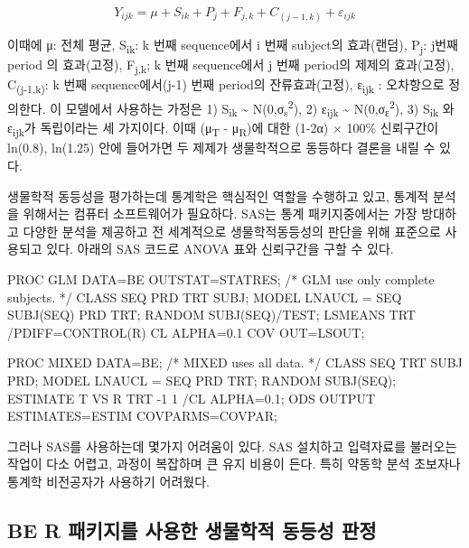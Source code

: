 \documentclass[
  11pt,
  krantz2, a4paper, twoside]{krantz}
\newenvironment{Shaded}{\begin{snugshade}}{\end{snugshade}}
\newcommand{\NormalTok}[1]{#1}
\theoremstyle{definition}
\theoremstyle{definition}
\theoremstyle{definition}
\theoremstyle{definition}
\theoremstyle{remark}
\begin{document}
\[
Y_{ijk} = \mu + S_{ik} + P_{j} + F_{j,k} + C_{(j-1,k)} + \varepsilon_{ijk}
\]

이때에 μ: 전체 평균, S\textsubscript{ik}: k 번째 sequence에서 i 번째 subject의 효과(랜덤), P\textsubscript{j}: j번째 period 의 효과(고정), F\textsubscript{j,k}; k 번째 sequence에서 j 번째 period의 제제의 효과(고정), C\textsubscript{(j-1,k)}: k 번째 sequence에서(j-1) 번째 period의 잔류효과(고정), ε\textsubscript{ijk} : 오차항으로 정의한다.
이 모델에서 사용하는 가정은 1) S\textsubscript{ik} \textasciitilde{} N(0,σ\textsubscript{s}\textsuperscript{2}), 2) ε\textsubscript{ijk} \textasciitilde{} N(0,σ\textsubscript{ε}\textsuperscript{2}), 3) S\textsubscript{ik} 와 ε\textsubscript{ijk}가 독립이라는 세 가지이다. 이때 (μ\textsubscript{T} - μ\textsubscript{R})에 대한 (1-2α) × 100\% 신뢰구간이 ln(0.8), ln(1.25) 안에 들어가면 두 제제가 생물학적으로 동등하다 결론을 내릴 수 있다.

생물학적 동등성을 평가하는데 통계학은 핵심적인 역할을 수행하고 있고, 통계적 분석을 위해서는 컴퓨터 소프트웨어가 필요하다. SAS는 통계 패키지중에서는 가장 방대하고 다양한 분석을 제공하고 전 세계적으로 생물학적동등성의 판단을 위해 표준으로 사용되고 있다. 아래의 SAS 코드로 ANOVA 표와 신뢰구간을 구할 수 있다.

\begin{Shaded}
\begin{Highlighting}[]
\NormalTok{PROC GLM DATA=BE OUTSTAT=STATRES; /* GLM use only complete subjects. */}
\NormalTok{CLASS SEQ PRD TRT SUBJ;}
\NormalTok{MODEL LNAUCL = SEQ SUBJ(SEQ) PRD TRT;}
\NormalTok{RANDOM SUBJ(SEQ)/TEST;}
\NormalTok{LSMEANS TRT /PDIFF=CONTROL(\textquotesingle{}R\textquotesingle{}) CL ALPHA=0.1 COV OUT=LSOUT;}

\NormalTok{PROC MIXED DATA=BE; /* MIXED uses all data. */}
\NormalTok{CLASS SEQ TRT SUBJ PRD;}
\NormalTok{MODEL LNAUCL = SEQ PRD TRT;}
\NormalTok{RANDOM SUBJ(SEQ);}
\NormalTok{ESTIMATE \textquotesingle{}T VS R\textquotesingle{} TRT {-}1 1 /CL ALPHA=0.1;}
\NormalTok{ODS OUTPUT ESTIMATES=ESTIM COVPARMS=COVPAR;}
\end{Highlighting}
\end{Shaded}

그러나 SAS를 사용하는데 몇가지 어려움이 있다. SAS 설치하고 입력자료를 불러오는 작업이 다소 어렵고, 과정이 복잡하며 큰 유지 비용이 든다. 특히 약동학 분석 초보자나 통계학 비전공자가 사용하기 어려웠다. 

\subsection{\texorpdfstring{BE R 패키지를 사용한 생물학적 동등성 판정}{BE R 패키지를 사용한 생물학적 동등성 판정}}\label{be-r-uxd328uxd0a4uxc9c0uxb97c-uxc0acuxc6a9uxd55c-uxc0dduxbb3cuxd559uxc801-uxb3d9uxb4f1uxc131-uxd310uxc815}
\end{document}
